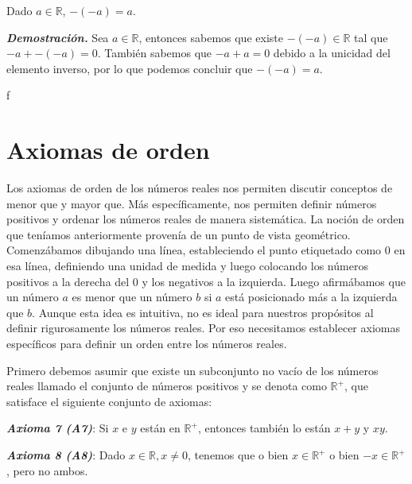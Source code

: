 \documentclass{report}
\begin{document}
    \begin{thBox}
        Dado $a \in \mathbb{R}$, $-(-a)=a$.
    \end{thBox}
    
    \textit{\textbf{Demostración.}} Sea $a \in \mathbb{R}$, entonces sabemos que existe $-(-a) \in \mathbb{R}$ tal que $-a + -(-a) = 0$. También sabemos que $-a+a=0$ debido a la unicidad del elemento inverso, por lo que podemos concluir que $-(-a) = a$.
    
    \begin{thBox}
        f
    \end{thBox}
    
    \section{Axiomas de orden}
    
    Los axiomas de orden de los números reales nos permiten discutir conceptos de menor que y mayor que. Más específicamente, nos permiten definir números positivos y ordenar los números reales de manera sistemática. La noción de orden que teníamos anteriormente provenía de un punto de vista geométrico. Comenzábamos dibujando una línea, estableciendo el punto etiquetado como $0$ en esa línea, definiendo una unidad de medida y luego colocando los números positivos a la derecha del $0$ y los negativos a la izquierda. Luego afirmábamos que un número $a$ es menor que un número $b$ si $a$ está posicionado más a la izquierda que $b$. Aunque esta idea es intuitiva, no es ideal para nuestros propósitos al definir rigurosamente los números reales. Por eso necesitamos establecer axiomas específicos para definir un orden entre los números reales.
    
    Primero debemos asumir que existe un subconjunto no vacío de los números reales llamado el conjunto de números positivos y se denota como $\mathbb{R}^+$, que satisface el siguiente conjunto de axiomas:
    
    \begin{axBox}
        \textit{\textbf{Axioma 7 (A7)}}: Si $x$ e $y$ están en $\mathbb{R}^+$, entonces también lo están $x+y$ y $xy$.
    \end{axBox}
    
    \begin{axBox}
        \textit{\textbf{Axioma 8 (A8)}}: Dado $x \in \mathbb{R}, x\neq 0$, tenemos que o bien $x\in \mathbb{R}^+$ o bien $-x\in \mathbb{R}^+$, pero no ambos.
    \end{axBox}
    
\end{document}
